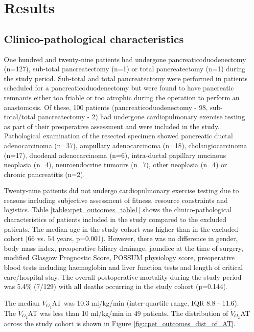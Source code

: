 \clearpage

\section{Results}

\subsection{Clinico-pathological characteristics}
One hundred and twenty-nine patients had undergone pancreaticoduodenectomy (n=127), sub-total pancreatectomy (n=1) or total pancreatectomy (n=1) during the study period. 
Sub-total and total pancreatectomy were performed in patients scheduled for a pancreaticoduodenectomy but were found to have pancreatic remnants either too friable or too atrophic during the operation to perform an anastomosis. 
Of these, 100 patients (pancreaticoduodenectomy - 98, sub-total/total pancreatectomy - 2) had undergone cardiopulmonary exercise testing as part of their preoperative assessment and were included in the study. 
Pathological examination of the resected specimen showed pancreatic ductal adenocarcinoma (n=37), ampullary adenocarcinoma (n=18), cholangiocarcinoma (n=17), duodenal adenocarcinoma (n=6), intra-ductal papillary mucinous neoplasia (n=4), neuroendocrine tumours (n=7), other neoplasia (n=4) or chronic pancreatitis (n=2).

Twenty-nine patients did not undergo cardiopulmonary exercise testing due to reasons including subjective assessment of fitness, resource constraints and logistics. 
Table \ref{table:cpet_outcomes_table1} shows the clinico-pathological characteristics of patients included in the study compared to the excluded patients. 
The median age in the study cohort was higher than in the excluded cohort (66 vs. 54 years, p=0.001). 
However, there was no difference in gender, body mass index, preoperative biliary drainage, jaundice at the time of surgery, modified Glasgow Prognostic Score, POSSUM physiology score, preoperative blood tests including haemoglobin and liver function tests and length of critical care/hospital stay. 
The overall postoperative mortality during the study period was 5.4\% (7/129) with all deaths occurring in the study cohort (p=0.144).



The median $\dot{V}_{O_2}$AT was 10.3 ml/kg/min (inter-quartile range, IQR 8.8 - 11.6). 
The $\dot{V}_{O_2}$AT was less than 10 ml/kg/min in 49 patients. 
The distribution of $\dot{V}_{O_2}$AT across the study cohort is shown in Figure \ref{fig:cpet_outcomes_dist_of_AT}.

